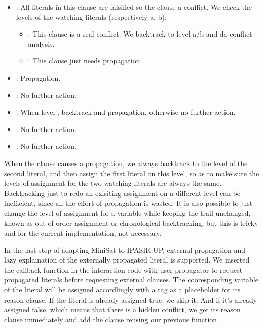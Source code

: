 \begin{itemize}
  \item {}: All literals in this clause are falsified so the clause a conflict. We check the levels of the watching literals (respectively a, b):
  \begin{itemize}
    \item {}: This clause is a real conflict. We backtrack to level a/b and do conflict analysis.
    \item {}: This clause just needs propagation.
  \end{itemize}
  \item {}: Propagation.
  \item {}: No further action.
  \item {}: When level , backtrack and propagation, otherwise no further action.
  \item {}: No further action.
  \item {}: No further action.
\end{itemize}

When the clause causes a propagation, we always backtrack to the level of the second literal, and then assign the first literal on this level, so as to make sure the levels of assignment for the two watching literals are always the same. Backtracking just to redo an exisiting assignment on a different level can be inefficient, since all the effort of propagation is wasted. It is also possible to just change the level of assignment for a variable while keeping the trail unchanged, known as out-of-order assignment or chronological backtracking, but this is tricky and for the current implementation, not necessary.

In the last step of adapting MiniSat to IPASIR-UP, external propagation and lazy explaination of the externally propagated literal is supported. We inserted the callback function  in the interaction code with user propagator to request propagated literals before requesting external clauses. The cooresponding variable of the literal will be assigned accordlingly with a tag  as a placeholder for its reason clause. If the literal is already assigned true, we skip it. And if it's already assigned false, which means that there is a hidden conflict, we get its reason clause immediately and add the clause reusing our previous function .

